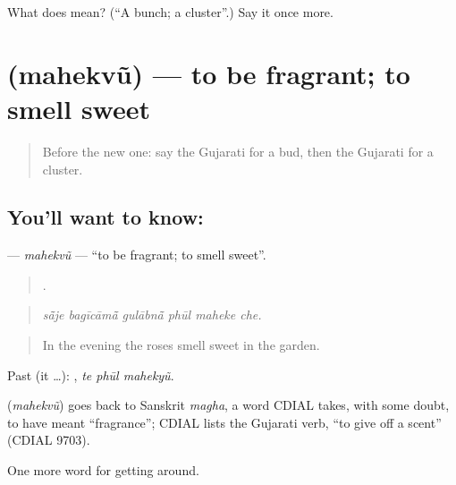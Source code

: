 \begin{tcolorbox}[breakable,colback=teal!4,colframe=teal!35!black,title={Before you move on}]
What does  mean? (\textquotedblleft{}A bunch; a cluster\textquotedblright{}.) Say it once more.
\end{tcolorbox}
\section[\texorpdfstring{\gu{મહેકવું} (mahekvũ)}{મહેકવું (mahekvũ)}]{ (mahekvũ) — to be fragrant; to smell sweet}

\label{lesson:GU-C444-mahekvu}



\begin{quote}
Before the new one: say the Gujarati for a bud, then the Gujarati for a cluster.
\end{quote}

\subsection*{You'll want to know: }
\textbf{} — \emph{mahekvũ} — \textquotedblleft{}to be fragrant; to smell sweet\textquotedblright{}.

\begin{quote}
     .
\end{quote}

\begin{quote}
\emph{sā̃je bagīcāmā̃ gulābnā̃ phūl maheke che.}
\end{quote}

\begin{quote}
In the evening the roses smell sweet in the garden.
\end{quote}

Past (it …):   , \emph{te phūl mahekyũ}.

\begin{cousinweb}
\textbf{} (\emph{mahekvũ}) goes back to Sanskrit \emph{magha}, a word CDIAL takes, with some doubt, to have meant \textquotedblleft{}fragrance\textquotedblright{}; CDIAL lists the Gujarati verb, \textquotedblleft{}to give off a scent\textquotedblright{} (CDIAL 9703).
\end{cousinweb}

\begin{grammarlens}[title={What you've built}]
One more word for getting around.
\end{grammarlens}

